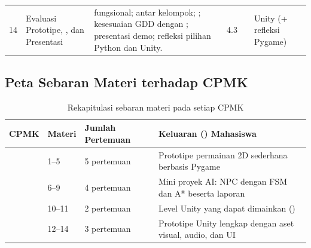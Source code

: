 \begin{landscape}
{\begin{longtable}{@{}L{1.3cm} L{4.4cm} L{11.5cm} L{2.1cm} L{1.7cm} L{2.6cm}@{}}
14 & Evaluasi Prototipe, , dan Presentasi &
 fungsional;  antar kelompok; ; kesesuaian GDD dengan ; presentasi demo; refleksi pilihan Python dan Unity. &
4.3 &  & Unity (+ refleksi Pygame) \\

\end{longtable}}
\end{landscape}

\subsection{Peta Sebaran Materi terhadap CPMK}

\begin{table}[htbp]
\centering
\caption{Rekapitulasi sebaran materi pada setiap CPMK}
\label{tab:sebaran-materi}
\begin{tabularx}{\textwidth}{@{}C{2.3cm} C{3.0cm} L{5.4cm} Y@{}}
\toprule
\headrow \textbf{CPMK} & \textbf{Materi} & \textbf{Jumlah Pertemuan} & \textbf{Keluaran () Mahasiswa} \\
\midrule
{} & 1--5   & 5 pertemuan & Prototipe permainan 2D sederhana berbasis Pygame \\
 & 6--9   & 4 pertemuan & Mini proyek AI: NPC dengan FSM dan A* beserta laporan  \\
 & 10--11 & 2 pertemuan & Level Unity yang dapat dimainkan () \\
 & 12--14 & 3 pertemuan & Prototipe Unity lengkap dengan aset visual, audio, dan UI \\
\bottomrule
\end{tabularx}
\end{table}
